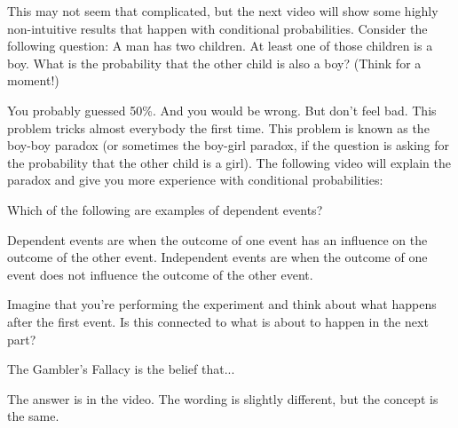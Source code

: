 \documentclass{ximera}
\begin{document}
This may not seem that complicated, but the next video will show some highly non-intuitive results that happen with conditional probabilities. Consider the following question: A man has two children. At least one of those children is a boy. What is the probability that the other child is also a boy? (Think for a moment!)

You probably guessed 50\%. And you would be wrong. But don't feel bad. This problem tricks almost everybody the first time. This problem is known as the boy-boy paradox (or sometimes the boy-girl paradox, if the question is asking for the probability that the other child is a girl). The following video will explain the paradox and give you more experience with conditional probabilities: 

\begin{question}
Which of the following are examples of dependent events?
  \begin{solution}
    \begin{multiple-choice}
      \end{multiple-choice}
    \begin{hint}
    Dependent events are when the outcome of one event has an influence on the outcome of the other event. Independent events are when the outcome of one event does not influence the outcome of the other event.
    \end{hint}
    \begin{hint}
    Imagine that you're performing the experiment and think about what happens after the first event. Is this connected to what is about to happen in the next part?
    \end{hint}
  \end{solution}
\end{question}

\begin{question}
The Gambler's Fallacy is the belief that...
  \begin{solution}
    \begin{multiple-choice}
      \end{multiple-choice}
    \begin{hint}
    The answer is in the video. The wording is slightly different, but the concept is the same.
    \end{hint}
  \end{solution}
\end{question}
\end{document}
